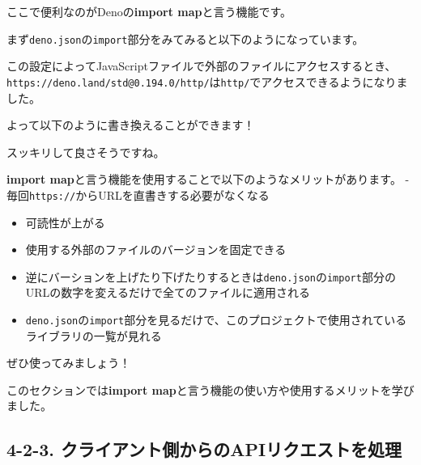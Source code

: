 ここで便利なのがDenoの\textbf{import map}と言う機能です。

まず\texttt{deno.json}の\texttt{import}部分をみてみると以下のようになっています。

\begin{Shaded}
\begin{Highlighting}[]
   \FunctionTok{\{}
    \FunctionTok{:} 
  \FunctionTok{\}}\ErrorTok{,}
\end{Highlighting}
\end{Shaded}

この設定によってJavaScriptファイルで外部のファイルにアクセスするとき、\\
\texttt{https://deno.land/std@0.194.0/http/}は\texttt{http/}でアクセスできるようになりました。

よって以下のように書き換えることができます！

\begin{Shaded}
\begin{Highlighting}[]
 \OperatorTok{;}
 \OperatorTok{;}
\end{Highlighting}
\end{Shaded}

スッキリして良さそうですね。

\textbf{import
map}と言う機能を使用することで以下のようなメリットがあります。 -
毎回\texttt{https://}からURLを直書きする必要がなくなる

\begin{itemize}
\item
  可読性が上がる
\item
  使用する外部のファイルのバージョンを固定できる
\item
  逆にバーションを上げたり下げたりするときは\texttt{deno.json}の\texttt{import}部分のURLの数字を変えるだけで全てのファイルに適用される
\item
  \texttt{deno.json}の\texttt{import}部分を見るだけで、このプロジェクトで使用されているライブラリの一覧が見れる
\end{itemize}

ぜひ使ってみましょう！

このセクションでは\textbf{import
map}と言う機能の使い方や使用するメリットを学びました。

\subsection{4-2-3.
クライアント側からのAPIリクエストを処理}\label{ux30afux30e9ux30a4ux30a2ux30f3ux30c8ux5074ux304bux3089ux306eapiux30eaux30afux30a8ux30b9ux30c8ux3092ux51e6ux7406}

